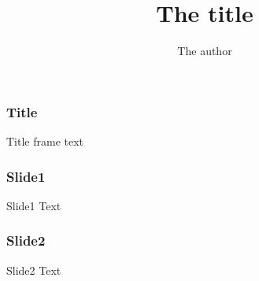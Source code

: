 \documentclass{beamer}
\title{The title}
\author{The author}
\begin{document}
\maketitle

\begin{frame}
\frametitle{Title}
Title frame text
\end{frame}

\begin{frame}
\frametitle{Slide1}
Slide1 Text
\end{frame}

\begin{frame}
\frametitle{Slide2}
Slide2 Text
\end{frame}
\end{document}
